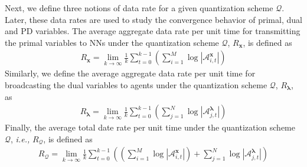 \documentclass[10pt,twocolumn,twoside]{IEEEtran}
\begin{document}
Next, we define three notions of data rate for a given quantization scheme $\mathcal{Q}$. Later, these data rates are used to study the convergence behavior of primal, dual and PD variables. The average aggregate data rate per unit time for transmitting the primal variables to NNs under the quantization scheme $\mathcal{Q}$, $R_{{\ensuremath{\boldsymbol{{x}}}}}$, is defined as
\begin{eqnarray}
R_{{\ensuremath{\boldsymbol{{x}}}}}=\lim_{k\rightarrow\infty}\frac{1}{k}\sum_{t=0}^{k-1}{\left({\sum_{i=1}^M\log{\left|{\mathcal{A}^{{\ensuremath{\boldsymbol{{x}}}}}_{i,t}}\right|}}\right)}
\end{eqnarray}
Similarly, we define the average aggregate data rate per unit time for broadcasting the dual variables to agents under the quantization scheme $\mathcal{Q}$, $R_{{\ensuremath{\boldsymbol{{\lambda}}}}}$, as
\begin{eqnarray}\label{Eq: R-dual}
R_{{\ensuremath{\boldsymbol{{\lambda}}}}}=\lim_{k\rightarrow\infty}\frac{1}{k}\sum_{t=0}^{k-1}{\left({\sum_{j=1}^N\log{\left|{\mathcal{A}^{{\ensuremath{\boldsymbol{{\lambda}}}}}_{j,t}}\right|}}\right)}
\end{eqnarray}
 Finally, the average total date rate per unit time under the quantization scheme $\mathcal{Q}$, \emph{i.e.,} $R_{\mathcal{Q}}$, is defined as
\begin{eqnarray}\label{Eq: R_total}
R_{\mathcal{Q}}=\lim_{k\rightarrow\infty}\frac{1}{k}\sum_{t=0}^{k-1}{\left({{\left({\sum_{i=1}^M\log{\left|{\mathcal{A}^{{\ensuremath{\boldsymbol{{x}}}}}_{i,t}}\right|}}\right)}+\sum_{j=1}^N\log{\left|{\mathcal{A}^{{\ensuremath{\boldsymbol{{\lambda}}}}}_{j,t}}\right|}}\right)}
\end{eqnarray}
\end{document}
